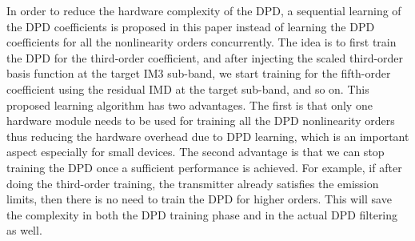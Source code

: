 In order to reduce the hardware complexity of the DPD, a sequential learning of the DPD coefficients is proposed in this paper instead of learning the DPD coefficients for all the nonlinearity orders concurrently. The idea is to first train the DPD for the third-order coefficient, and after injecting the scaled third-order basis function at the target IM3 sub-band, we start training for the fifth-order coefficient using the residual IMD at the target sub-band, and so on. This proposed learning algorithm has two advantages. The first is that only one hardware module needs to be used for training all the DPD nonlinearity orders thus reducing the hardware overhead due to DPD learning, which is an important aspect especially for small devices. The second advantage is that we can stop training the DPD once a sufficient performance is achieved. For example, if after doing the third-order training, the transmitter already satisfies the emission limits, then there is no need to train the DPD for higher orders. This will save the complexity in both the DPD training phase and in the actual DPD filtering as well.

